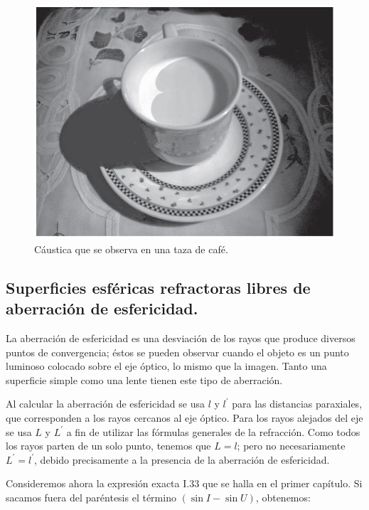 \documentclass[14pt]{extarticle}
\begin{document}
\begin{figure}[H]
    \centering
    \includegraphics[scale=0.7]{Imagenes/Aberraciones_04.png}
    \caption{Cáustica que se observa en una taza de café.}
    \label{fig:figura_V_04}
\end{figure}

\subsection{Superficies esféricas refractoras libres de aberración de esfericidad.}

La aberración de esfericidad es una desviación de los rayos que produce diversos puntos de convergencia; éstos se pueden observar cuando el objeto es un punto luminoso colocado sobre el eje óptico, lo mismo que la imagen. Tanto una superficie simple como una lente tienen este tipo de aberración.

Al calcular la aberración de esfericidad se usa $l$ y $l^{\prime}$ para las distancias paraxiales, que corresponden a los rayos cercanos al eje óptico. Para los rayos alejados del eje se usa $L$ y $L^{\prime}$ a fin de utilizar las fórmulas generales de la refracción. Como todos los rayos parten de un solo punto, tenemos que $L = l$; pero no necesariamente $L^{\prime} = l^{\prime}$, debido precisamente a la presencia de la aberración de esfericidad.

Consideremos ahora la expresión exacta I.33 que se halla en el primer capítulo. Si sacamos fuera del paréntesis el término $(\sin I - \sin U)$, obtenemos: 




 
\end{document}
